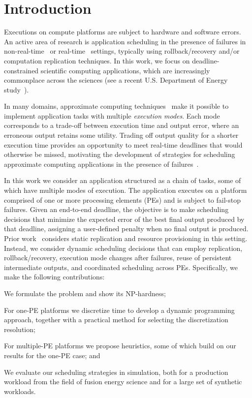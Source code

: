 \chapter{Introduction}
\label{sec:introduction}


Executions on compute platforms are subject to hardware
and software errors. An active area of research is application scheduling
in the presence of failures in non-real-time~\cite{10.5555/2811302}
or real-time~\cite{10.1145/3589950} settings, typically using
rollback/recovery and/or computation replication techniques.  In this work, 
we focus on deadline-constrained scientific computing applications, which
are increasingly commonplace across the sciences (see a recent
U.S. Department of Energy study~\cite{IRI-workflows}).

In many domains, approximate computing techniques~\cite{10.1145/3716845}
make it possible to implement application tasks with multiple \emph{execution
modes}. Each mode corresponds to a trade-off between execution
time and output error, where an erroneous output retains some utility.
Trading off output quality for a
shorter execution time provides an opportunity to meet real-time deadlines
that would otherwise be missed, motivating the development of strategies
for scheduling approximate computing applications in the presence of
failures~\cite{10.1145/2442087.2442094, 10.1007/s11227-021-03764-x,
259428, 10.1177/0037549709340729, 10.1109/TC.2003.1183950, 7570524}.


In this work we consider an application structured as a chain of tasks,
some of which have multiple modes of execution. The application executes on
a platform comprised of one or more processing elements (PEs) and is
subject to fail-stop failures.  Given an end-to-end deadline, the objective
is to make scheduling decisions that minimize the expected error of the
best final output produced by that deadline, assigning a user-defined penalty
when no final output is produced.  Prior work~\cite{10678736}
considers static replication and resource provisioning in this setting. 
Instead, we consider dynamic scheduling decisions 
that can employ replication, rollback/recovery,
execution mode changes after failures, reuse of persistent intermediate
outputs, and coordinated scheduling across PEs.  Specifically, we make the
following contributions:
\begin{compactitem}
    \item We formulate the problem and show its NP-hardness;
    \item For one-PE platforms we discretize time to develop a dynamic programming approach, together with a practical method for selecting the discretization resolution;
    \item For multiple-PE platforms we propose heuristics, some of which build on our results for the one-PE case; and
    \item We evaluate our scheduling strategies in simulation, both for a production workload from the field of fusion energy science and for a large set of synthetic workloads. 
\end{compactitem}

